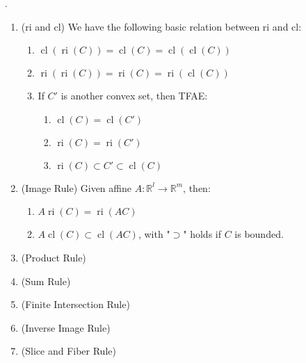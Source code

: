 \begin{prop}\label{prop:012-yoga-ri-cl}.
	\begin{enumerate}[label=(\alph*)]
		\item (ri and cl) We have the following basic relation between ri and cl:
		      \begin{enumerate}[label=(\roman*)]
			      \item $\operatorname{cl}(\operatorname{ri}(C))=\operatorname{cl}(C)=\operatorname{cl}(\operatorname{cl}(C))$
			      \item $\operatorname{ri}(\operatorname{ri}(C))=\operatorname{ri}(C)=\operatorname{ri}(\operatorname{cl}(C))$
			      \item If $C'$ is another convex set, then TFAE:
			            \begin{enumerate}[label=(\arabic*)]
				            \item $\operatorname{cl}(C)=\operatorname{cl}(C')$
				            \item $\operatorname{ri}(C)=\operatorname{ri}(C')$
				            \item $\operatorname{ri}(C)\subset C'\subset\operatorname{cl}(C)$
			            \end{enumerate}
		      \end{enumerate}
		\item (Image Rule) Given affine $A:\mathbb{R}^l\to \mathbb{R}^m$, then:
		      \begin{enumerate}[label=(\roman*)]
			      \item $A\operatorname{ri}(C)=\operatorname{ri}(AC)$
			      \item $A\operatorname{cl}(C)\subset \operatorname{cl}(AC)$, with "$\supset$" holds if $C$ is bounded.
		      \end{enumerate}
		\item (Product Rule)
		\item (Sum Rule)
		\item (Finite Intersection Rule)
		\item (Inverse Image Rule)
		\item (Slice and Fiber Rule)
	\end{enumerate}
\end{prop}

